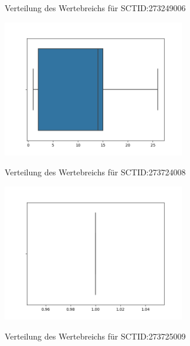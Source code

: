 \documentclass[12pt,a4paper,toc=bibliographynumbered,toc=indenttextentries]{scrreprt}
\begin{document}
\begin{center}
			\small{Verteilung des Wertebreichs für SCTID:273249006}
			
			\includegraphics[width=8cm]{Graphs/273724008.png}
			
			\small{Verteilung des Wertebreichs für SCTID:273724008}
			
			\includegraphics[width=8cm]{Graphs/273725009.png}
			
			\small{Verteilung des Wertebreichs für SCTID:273725009}
			\end{center}
		\clearpage
\end{document}
